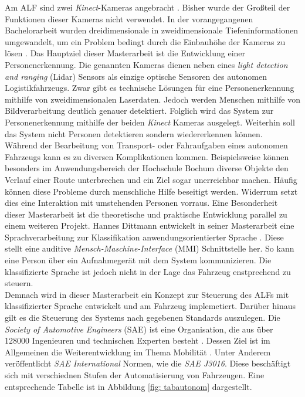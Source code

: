 		Am ALF sind zwei \textit{Kinect}-Kameras angebracht \cite{Bachelorarbeit}. Bisher wurde der Großteil der Funktionen dieser Kameras nicht verwendet. In der vorangegangenen Bachelorarbeit wurden dreidimensionale in zweidimensionale Tiefeninformationen umgewandelt, um ein Problem bedingt durch die Einbauhöhe der Kameras zu lösen \cite{Bachelorarbeit}. Das Hauptziel dieser Masterarbeit ist die Entwicklung einer Personenerkennung. Die genannten Kameras dienen neben eines \textit{light detection and ranging} (Lidar) Sensors als einzige optische Sensoren des autonomen Logistikfahrzeugs. Zwar gibt es technische Lösungen für eine Personenerkennung mithilfe von zweidimensionalen Laserdaten. Jedoch werden Menschen mithilfe von Bildverarbeitung deutlich genauer detektiert. Folglich wird das System zur Personenerkennung mithilfe der beiden \textit{Kinect} Kameras ausgelegt. Weiterhin soll das System nicht Personen detektieren sondern wiedererkennen können. \\
		
		Während der Bearbeitung von Transport- oder Fahraufgaben eines autonomen Fahrzeugs kann es zu diversen Komplikationen kommen. Beispielsweise können besonders im Anwendungsbereich der Hochschule Bochum diverse Objekte den Verlauf einer Route unterbrechen und ein Ziel sogar unerreichbar machen. Häufig können diese Probleme durch menschliche Hilfe beseitigt werden. Widerrum setzt dies eine Interaktion mit umstehenden Personen vorraus. Eine Besonderheit dieser Masterarbeit ist die theoretische und praktische Entwicklung parallel zu einem weiteren Projekt. Hannes Dittmann entwickelt in seiner Masterarbeit eine Sprachverarbeitung zur Klassifikation anwendungsorientierter Sprache \cite{Dittmann}. Diese stellt eine auditive \textit{Mensch-Maschine-Interface} (MMI) Schnittstelle her. So kann eine Person über ein Aufnahmegerät mit dem System kommunizieren. Die klassifizierte Sprache ist jedoch nicht in der Lage das Fahrzeug enstprechend zu steuern.\\
		
		Demnach wird in dieser Masterarbeit ein Konzept zur Steuerung des ALFs mit klassifizierter Sprache entwickelt und am Fahrzeug implemetiert. Darüber hinaus gilt es die Steuerung des Systems nach gegebenen Standards auszulegen. Die \textit{Society of Automotive Engineers} (SAE) ist eine Organisation, die aus über 128000 Ingenieuren und technischen Experten besteht \cite{saeorg}. Dessen Ziel ist im Allgemeinen die Weiterentwicklung im Thema Mobilität \cite{saeorg}. Unter Anderem veröffentlicht \textit{SAE International} Normen, wie die \textit{SAE J3016}. Diese beschäftigt sich mit verschiednen Stufen der Automatisierung von Fahrzeugen. Eine entsprechende Tabelle ist in Abbildung \ref{fig: tabautonom} dargestellt.\\
		
